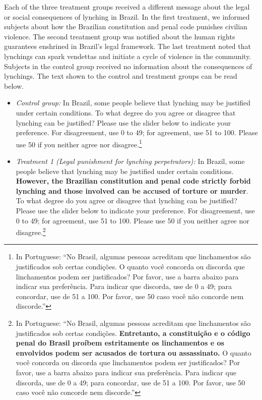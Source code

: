 \documentclass[12pt,a4paper]{article}
\providecommand{\tightlist}{%
   \setlength{\itemsep}{0pt}\setlength{\parskip}{0pt}}
\begin{document}
Each of the three treatment groups received a different message about the legal or social consequences of lynching in Brazil. In the first treatment, we informed subjects about how the Brazilian constitution and penal code punishes civilian violence. The second treatment group was notified about the human rights guarantees enshrined in Brazil's legal framework. The last treatment noted that lynchings can spark vendettas and initiate a cycle of violence in the community. Subjects in the control group received no information about the consequences of lynchings. The text shown to the control and treatment groups can be read below.

\begin{itemize}
\tightlist
\item
  \emph{Control group:} In Brazil, some people believe that lynching may be justified under certain conditions. To what degree do you agree or disagree that lynching can be justified? Please use the slider below to indicate your preference. For disagreement, use 0 to 49; for agreement, use 51 to 100. Please use 50 if you neither agree nor disagree.\footnote{In Portuguese: ``No Brasil, algumas pessoas acreditam que linchamentos são justificados sob certas condições. O quanto você concorda ou discorda que linchamentos podem ser justificados? Por favor, use a barra abaixo para indicar sua preferência. Para indicar que discorda, use de 0 a 49; para concordar, use de 51 a 100. Por favor, use 50 caso você não concorde nem discorde.''}
\end{itemize}

\begin{itemize}
\tightlist
\item
  \emph{Treatment 1 (Legal punishment for lynching perpetrators):} In Brazil, some people believe that lynching may be justified under certain conditions. \textbf{However, the Brazilian constitution and penal code strictly forbid lynching and those involved can be accused of torture or murder}. To what degree do you agree or disagree that lynching can be justified? Please use the slider below to indicate your preference. For disagreement, use 0 to 49; for agreement, use 51 to 100. Please use 50 if you neither agree nor disagree.\footnote{In Portuguese: ``No Brasil, algumas pessoas acreditam que linchamentos são justificados sob certas condições. \textbf{Entretanto, a constituição e o código penal do Brasil proíbem estritamente os linchamentos e os envolvidos podem ser acusados de tortura ou assassinato.} O quanto você concorda ou discorda que linchamentos podem ser justificados? Por favor, use a barra abaixo para indicar sua preferência. Para indicar que discorda, use de 0 a 49; para concordar, use de 51 a 100. Por favor, use 50 caso você não concorde nem discorde.''}
\end{itemize}
\end{document}
